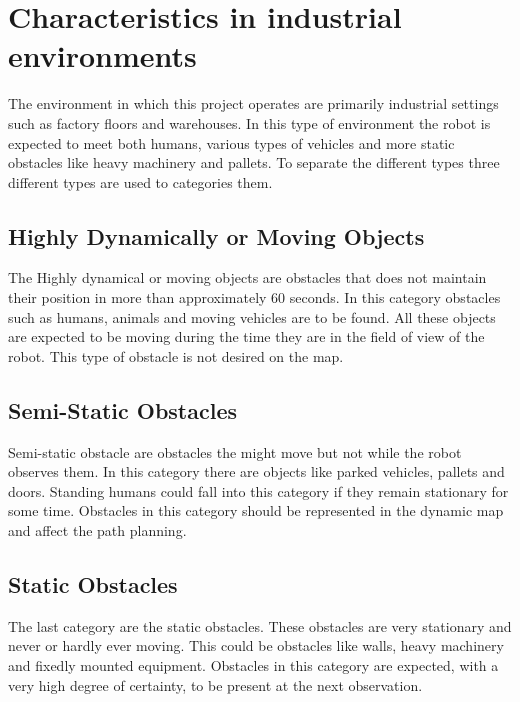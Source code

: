 \section{Characteristics in industrial environments}
The environment in which this project operates are primarily industrial settings such as factory floors and warehouses. 
In this type of environment the robot is expected to meet both humans, various types of vehicles and more static obstacles like heavy machinery and pallets. To separate the different types three different types are used to categories them. 

\subsection{Highly Dynamically or Moving Objects}
The Highly dynamical or moving objects are obstacles that does not maintain their position in more than approximately 60 seconds. 
In this category obstacles such as humans, animals and moving vehicles are to be found. All these objects are expected to be moving during the time they are in the field of view of the robot.
This type of obstacle is not desired on the map. 

\subsection{Semi-Static Obstacles}
Semi-static obstacle are obstacles the might move but not while the robot observes them. In this category there are objects like parked vehicles, pallets and doors. Standing humans could fall into this category if they remain stationary for some time.
Obstacles in this category should be represented in the dynamic map and affect the path planning. 

\subsection{Static Obstacles}
The last category are the static obstacles. 
These obstacles are very stationary and never or hardly ever moving. This could be obstacles like walls, heavy machinery and fixedly mounted equipment. 
Obstacles in this category are expected, with a very high degree of certainty, to be present at the next observation. 
